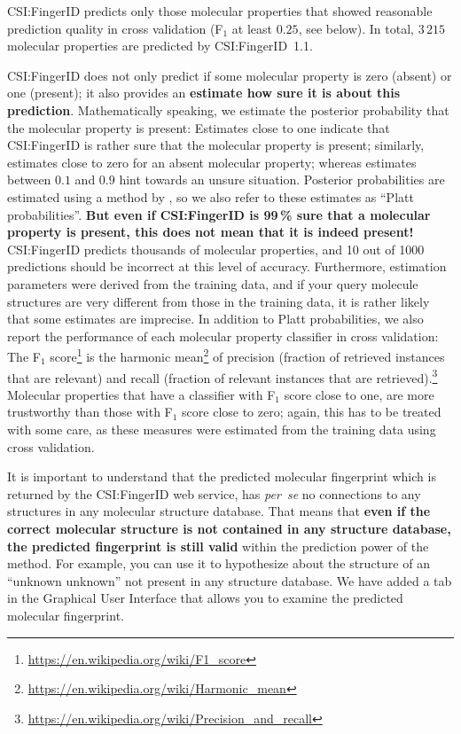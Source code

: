 \documentclass[letterpaper,10pt,openany,oneside]{sphinxmanual}
\begin{document}
CSI:FingerID predicts only those molecular properties that showed reasonable
prediction quality in cross validation (F$_1$ at least $0.25$, see below).
In total, $3\,215$ molecular properties are predicted by CSI:FingerID~1.1.

CSI:FingerID does not only predict if some molecular property is zero
(absent) or one (present); it also provides an \textbf{estimate how sure it
is about this prediction}.  Mathematically speaking, we estimate the
posterior probability that the molecular property is present: Estimates close
to one indicate that CSI:FingerID is rather sure that the molecular property
is present; similarly, estimates close to zero for an absent molecular
property; whereas estimates between $0.1$ and $0.9$ hint towards an unsure
situation.  Posterior probabilities are estimated using a method
by \citet{platt00probabilistic}, so we also refer to these estimates as
``Platt probabilities''.  \textbf{But even if CSI:FingerID is 99\,\% sure
that a molecular property is present, this does not mean that it is indeed
present!}  CSI:FingerID predicts thousands of molecular properties, and 10
out of 1000 predictions should be incorrect at this level of accuracy.
Furthermore, estimation parameters were derived from the training data, and
if your query molecule structures are very different from those in the
training data, it is rather likely that some estimates are imprecise.  In
addition to Platt probabilities, we also report the performance of each
molecular property classifier in cross validation: The F$_1$
score\footnote{\url{https://en.wikipedia.org/wiki/F1_score}} is the harmonic
mean\footnote{\url{https://en.wikipedia.org/wiki/Harmonic_mean}} of precision
(fraction of retrieved instances that are relevant) and recall (fraction of
relevant instances that are
retrieved).\footnote{\url{https://en.wikipedia.org/wiki/Precision_and_recall}}
Molecular properties that have a classifier with F$_1$ score close to one,
are more trustworthy than those with F$_1$ score close to zero; again, this
has to be treated with some care, as these measures were estimated from the
training data using cross validation.

It is important to understand that the predicted molecular fingerprint which
is returned by the CSI:FingerID web service, has \emph{per~se} no connections
to any structures in any molecular structure database.  That means
that \textbf{even if the correct molecular structure is not contained in any
structure database, the predicted fingerprint is still valid} within the
prediction power of the method.  For example, you can use it to hypothesize
about the structure of an ``unknown unknown'' not present in any structure
database.  We have added a tab in the Graphical User Interface that allows
you to examine the predicted molecular fingerprint.
\end{document}
